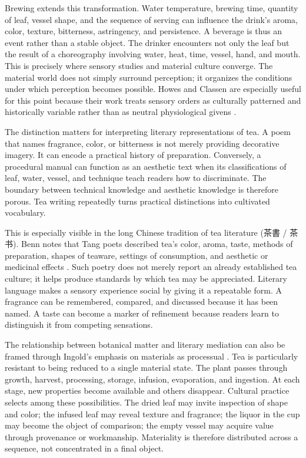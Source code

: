 \documentclass[numbers]{IntechOpen-Book}
\newcommand{\zh}[1]{{\CJKfontspec{Noto Serif CJK SC}\upshape #1}}
\begin{document}
Brewing extends this transformation. Water temperature, brewing time, quantity of leaf, vessel shape, and the sequence of serving can influence the drink's aroma, color, texture, bitterness, astringency, and persistence. A beverage is thus an event rather than a stable object. The drinker encounters not only the leaf but the result of a choreography involving water, heat, time, vessel, hand, and mouth. This is precisely where sensory studies and material culture converge. The material world does not simply surround perception; it organizes the conditions under which perception becomes possible. Howes and Classen are especially useful for this point because their work treats sensory orders as culturally patterned and historically variable rather than as neutral physiological givens \cite{howes,classen}.

The distinction matters for interpreting literary representations of tea. A poem that names fragrance, color, or bitterness is not merely providing decorative imagery. It can encode a practical history of preparation. Conversely, a procedural manual can function as an aesthetic text when its classifications of leaf, water, vessel, and technique teach readers how to discriminate. The boundary between technical knowledge and aesthetic knowledge is therefore porous. Tea writing repeatedly turns practical distinctions into cultivated vocabulary.

This is especially visible in the long Chinese tradition of tea literature (\zh{茶書 / 茶书}). Benn notes that Tang poets described tea's color, aroma, taste, methods of preparation, shapes of teaware, settings of consumption, and aesthetic or medicinal effects \cite{bennpoetry}. Such poetry does not merely report an already established tea culture; it helps produce standards by which tea may be appreciated. Literary language makes a sensory experience social by giving it a repeatable form. A fragrance can be remembered, compared, and discussed because it has been named. A taste can become a marker of refinement because readers learn to distinguish it from competing sensations.

The relationship between botanical matter and literary mediation can also be framed through Ingold's emphasis on materials as processual \cite{ingoldmaterials}. Tea is particularly resistant to being reduced to a single material state. The plant passes through growth, harvest, processing, storage, infusion, evaporation, and ingestion. At each stage, new properties become available and others disappear. Cultural practice selects among these possibilities. The dried leaf may invite inspection of shape and color; the infused leaf may reveal texture and fragrance; the liquor in the cup may become the object of comparison; the empty vessel may acquire value through provenance or workmanship. Materiality is therefore distributed across a sequence, not concentrated in a final object.
\end{document}
